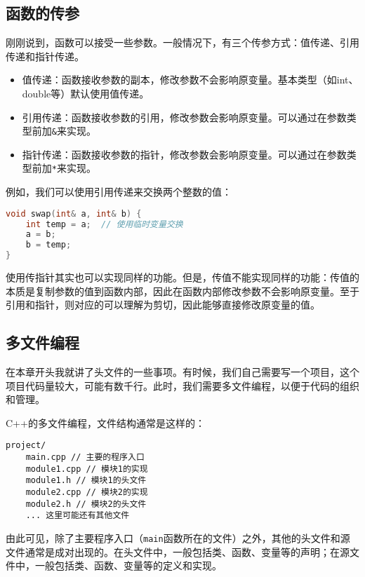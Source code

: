 \subsection{函数的传参}

刚刚说到，函数可以接受一些参数。一般情况下，有三个传参方式：值传递、引用传递和指针传递。
\begin{itemize}
  \item 值传递：函数接收参数的副本，修改参数不会影响原变量。基本类型（如int、double等）默认使用值传递。
  \item 引用传递：函数接收参数的引用，修改参数会影响原变量。可以通过在参数类型前加\texttt{\&}来实现。
  \item 指针传递：函数接收参数的指针，修改参数会影响原变量。可以通过在参数类型前加\texttt{*}来实现。
\end{itemize}
例如，我们可以使用引用传递来交换两个整数的值：
\begin{lstlisting}[language=C++]
void swap(int& a, int& b) {
    int temp = a;  // 使用临时变量交换
    a = b;
    b = temp;
}
\end{lstlisting}
使用传指针其实也可以实现同样的功能。但是，传值不能实现同样的功能：传值的本质是复制参数的值到函数内部，因此在函数内部修改参数不会影响原变量。至于引用和指针，则对应的可以理解为剪切，因此能够直接修改原变量的值。


\subsection{多文件编程}

在本章开头我就讲了头文件的一些事项。有时候，我们自己需要写一个项目，这个项目代码量较大，可能有数千行。此时，我们需要多文件编程，以便于代码的组织和管理。

C++的多文件编程，文件结构通常是这样的：
\begin{lstlisting}
project/
    main.cpp // 主要的程序入口
    module1.cpp // 模块1的实现
    module1.h // 模块1的头文件
    module2.cpp // 模块2的实现
    module2.h // 模块2的头文件
    ... 这里可能还有其他文件
\end{lstlisting}
由此可见，除了主要程序入口（\texttt{main}函数所在的文件）之外，其他的头文件和源文件通常是成对出现的。在头文件中，一般包括类、函数、变量等的声明；在源文件中，一般包括类、函数、变量等的定义和实现。

